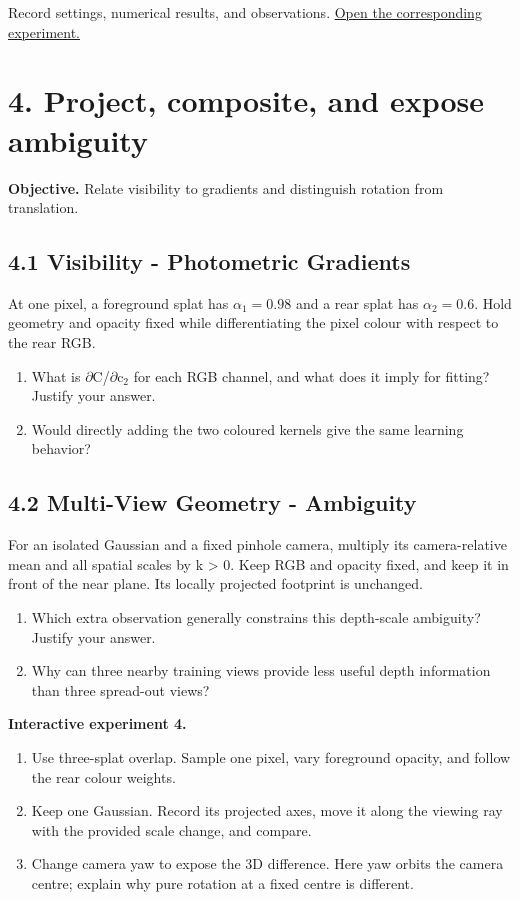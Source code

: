 \documentclass[11pt,a4paper]{article}
\begin{document}
Record settings, numerical results, and observations.
\href{https://sosekie.github.io/Unibe-CVG-CV-Interactive-Labs/tutorial-09/#parameters}{Open the corresponding experiment.}\par
{}\section*{4. Project, composite, and expose ambiguity}
\noindent\textbf{Objective.} Relate visibility to gradients and distinguish rotation from translation.
\subsection*{4.1 Visibility - Photometric Gradients}
At one pixel, a foreground splat has $\alpha_1=0.98$ and a rear splat has $\alpha_2=0.6$.
Hold geometry and opacity fixed while differentiating the pixel colour with respect to the rear RGB.
\begin{enumerate}[label=(\alph*),nosep]
\item What is $\partial$C/$\partial$c${}_2$ for each RGB channel, and what does it imply for fitting?
Justify your answer.
\item Would directly adding the two coloured kernels give the same learning behavior?
\end{enumerate}
\subsection*{4.2 Multi-View Geometry - Ambiguity}
For an isolated Gaussian and a fixed pinhole camera, multiply its camera-relative mean and all spatial scales by k > 0.
Keep RGB and opacity fixed, and keep it in front of the near plane.
Its locally projected footprint is unchanged.
\begin{enumerate}[label=(\alph*),nosep]
\item Which extra observation generally constrains this depth-scale ambiguity?
Justify your answer.
\item Why can three nearby training views provide less useful depth information than three spread-out views?
\end{enumerate}
\noindent\textbf{Interactive experiment 4.}\begin{enumerate}[nosep]
\item Use three-splat overlap.
Sample one pixel, vary foreground opacity, and follow the rear colour weights.
\item Keep one Gaussian.
Record its projected axes, move it along the viewing ray with the provided scale change, and compare.
\item Change camera yaw to expose the 3D difference.
Here yaw orbits the camera centre; explain why pure rotation at a fixed centre is different.
\end{enumerate}
\end{document}
